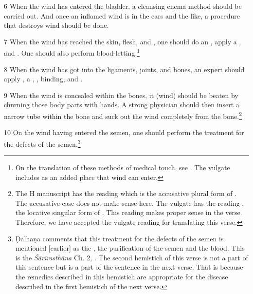 \begin{translation}
    \item [6] When the wind has entered the bladder, a cleansing enema method
should be carried out. And once an inflamed wind is in the ears and the like,
a procedure that destroys wind should be done.

    \item [7]
    When the wind has reached the skin, flesh, and , one should do 
    an 
    , apply a ,  
     and . One should also 
    perform blood-letting.\footnote{On the translation of these methods of 
    medical touch, see \cite[ch.\,4]{broo-2021}.  The vulgate includes 
     as an added place that wind can enter.}

    \item[8]
    When the wind has got into the ligaments, joints, and bones, an expert 
    should apply  ,  a ,
    , binding, and .


    \item [9]
    When the wind is concealed within the bones, it (wind) should be beaten by 
    churning those body parts with hands. A strong physician should then insert a 
    narrow tube within the bone and suck out the wind completely from the 
    bone.\footnote{The H manuscript has the reading  which is the 
    accusative plural form of . The accusative case does not make 
    sense here.  The vulgate has the reading , the locative singular 
    form of . This reading makes proper sense in the verse. 
    Therefore, we have accepted the vulgate reading  for 
    translating this verse.} 

    \item[10]
    On the wind having entered the semen, one should perform the treatment for the defects of the semen.\footnote{Ḍalhaṇa comments \citep[421]{vulgate} that this treatment for the defects of the semen is mentioned [earlier] as the , the purification of the semen and the blood. This is the \emph{Śārīrasthāna} Ch. 2, . The second hemistich of this verse is not a part of this sentence but is a part of the sentence in the next verse. That is because the remedies described in this hemistich are appropriate for the disease described in the first hemistich of the next verse.}


\end{translation}
